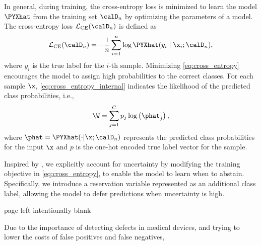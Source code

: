 In general, during training, the cross-entropy loss is minimized to learn the model \(\PYXhat\) from the training set \(\calD_n\) by optimizing the parameters of a model. The cross-entropy loss \(\mathcal{L}_{\mathrm{CE}}(\calD_n)\) is defined as
\begin{align}
    \label{eq:cross_entropy}
    \mathcal{L}_{\mathrm{CE}}(\calD_n)
    = -\frac{1}{n}\sum_{i=1}^{n}
    \log \PYXhat(y_i \mid \x_i;\calD_n),
\end{align}
where \(y_i\) is the true label for the \(i\)-th sample.
Minimizing \cref{eq:cross_entropy} encourages the model to assign high probabilities to the correct classes.
For each sample \(\x\), \cref{eq:cross_entropy_internal} indicates the likelihood of the predicted class probabilities, i.e.,
\begin{align}
    \label{eq:cross_entropy_internal}
    \W=\sum_{j=1}^{C} p_{j}\log\left(\phat_{j}\right),
\end{align}
where \(\phat=\PYXhat(\cdot|\x;\calD_n)\) represents the predicted class probabilities for the input \(\x\) and \(p\) is the one-hot encoded true label vector for the sample.

Inspired by \cite{chow1970optimum,markowitz1952portfolio,liu2019deep}, we explicitly account for uncertainty by modifying the training objective in \cref{eq:cross_entropy}, to enable the model to learn when to abstain. Specifically, we introduce a reservation variable represented as an additional class label, allowing the model to defer predictions when uncertainty is high.

\clearpage

page left intentionally blank

\clearpage

Due to the importance of detecting defects in medical devices, and trying to lower the costs of false positives and false negatives,

